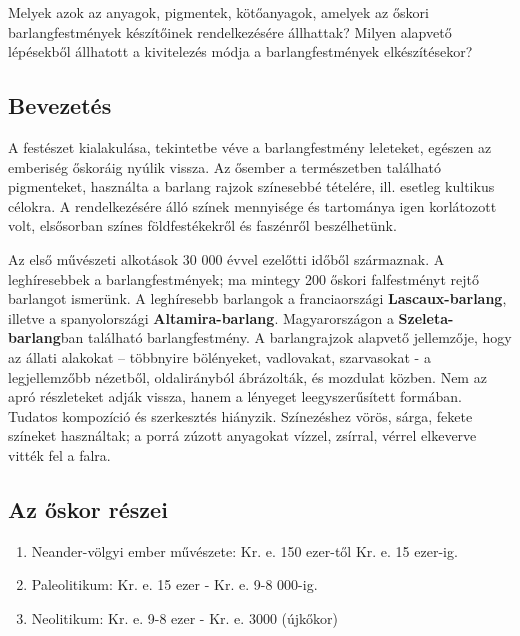 	Melyek azok az anyagok, pigmentek, kötőanyagok, amelyek az őskori barlangfestmények készítőinek rendelkezésére állhattak? Milyen alapvető lépésekből állhatott a kivitelezés módja a barlangfestmények elkészítésekor?
	
	\subsection{Bevezetés}
		A festészet kialakulása, tekintetbe véve a barlangfestmény leleteket, egészen az emberiség őskoráig nyúlik vissza. Az ősember a természetben található pigmenteket, használta a barlang rajzok színesebbé tételére, ill. esetleg kultikus célokra. A rendelkezésére álló színek mennyisége és tartománya igen korlátozott volt, elsősorban színes földfestékekről és faszénről beszélhetünk.
		
		Az első művészeti alkotások 30 000 évvel ezelőtti időből származnak. A leghíresebbek a
		barlangfestmények; ma mintegy 200 őskori falfestményt rejtő barlangot ismerünk. A
		leghíresebb barlangok a franciaországi \textbf{Lascaux-barlang}, illetve a spanyolországi \textbf{Altamira-barlang}.
		Magyarországon a \textbf{Szeleta-barlang}ban található barlangfestmény.
		A barlangrajzok alapvető jellemzője, hogy az állati alakokat – többnyire bölényeket,
		vadlovakat, szarvasokat - a legjellemzőbb nézetből, oldalirányból ábrázolták, és mozdulat
		közben. Nem az apró részleteket adják vissza, hanem a lényeget leegyszerűsített formában.
		Tudatos kompozíció és szerkesztés hiányzik. Színezéshez vörös, sárga, fekete színeket
		használtak; a porrá zúzott anyagokat vízzel, zsírral, vérrel elkeverve vitték fel a falra. 
	
	\subsection{Az őskor részei}
	
	\begin{enumerate}
		\item Neander-völgyi ember művészete: Kr. e. 150 ezer-től Kr. e. 15 ezer-ig.
		\item Paleolitikum: Kr. e. 15 ezer - Kr. e. 9-8 000-ig.
		\item Neolitikum: Kr. e. 9-8 ezer - Kr. e. 3000 (újkőkor)
	\end{enumerate}
	
